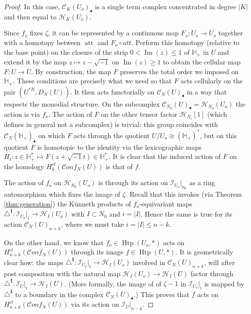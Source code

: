 \documentclass[10pt,a4paper]{amsart}
\def\Cscr{{\mathscr C}}
\def\HH{{\mathbb H}}
\def\Hcal{{\mathcal H}}
\def\Ibold{\mathbf {I}}
\def\Ical{{\mathcal I}}
\def\pt{{\scriptscriptstyle\bullet}}
\def\tri{\triangle}
\newcommand\Htp{\operatorname{Htp}}
\newcommand\att{\operatorname{att}}
\newcommand\conf{\mathscr{C}\!\mathit{onf}\!}
\newcommand\im{\operatorname{Im}}
\begin{document}
\begin{proof}
In this case, $\Cscr_K(U_o)_\pt$ is a single term complex concentrated in degree $|K|$ and then equal to $\Hcal_K(U_o)$.

Since $f_o$ fixes $\zeta$, it can be represented by a continuous map $F_o:U_o\to U_o$ together with a homotopy between $\att$ and $F_o\circ att$. 
Perform this homotopy (relative to the base point) on the closure of the strip  $0<\im(z)\le 1$ of $\HH_+$ in $U$ and extend it by the map $z\mapsto z-\sqrt{-1}$ on $\im(z)\ge 1$ to obtain the cellular map $F: U\to U$. 
By construction, the map $F$  preserves the total order we imposed on $\HH_+$. These conditions are precisely what we need so that $F$ acts cellularly on the pair  $(U^{*N}, D_N(U))$.  It then acts functorially on  $\Cscr_N(U)_\pt$ in a way that respects the monodial structure. On the subcomplex $\Cscr_{N_0}(U)_\pt=\Hcal_{N_0}(U_o)$ the action is via $f_o$. 
The action of $F$ on the other  tensor factor $\Hcal_{N_i}[1]$ (which defines   in general not a subcomplex) is trivial: this group  coincides with 
$\Cscr_N(\HH_+)_\pt$ on which $F$ acts through the quotient $U/U_o\cong (\HH_+)^*$, but on this quotient 
$F$ is homotopic to the identity via the lexicographic maps $H_t:z\in \HH_+^*\mapsto F(z+\sqrt{-1}t)\in \HH_+^*$. It is clear that the induced action of $F$ on the  homology $H^{cl}_k(\conf_N(U))$ is that of $f$. 

The  action  of $f_o$ on $\Hcal_{N_0}(U_o)$ is through its action on  $\Ical_{U_o}|_{n_0}$ as a ring automorphism which  fixes the image of $\zeta$. Recall that this invokes (via Theorem \ref{thm:generation}) the K\"unneth products of  $f_o$-equivariant maps 
$\tri^\Ibold: \Ical_{U_o}|_i\to \Hcal_I(U_o)$ with $I\subset N_0$ and $i=|I|$.  
Hence  the same is true for its action  $\Cscr_{N}(U)_{n+k}$,  where we must take   $i=|I|\le n-k$. 

On the other hand,  we know that $f_o\in \Htp(U_o,*)$ acts on $H^{cl}_{n+k}(\conf_N(U))$ through its image 
$f\in \Htp(U,*)$. It is  geometrically  clear how: the maps $\tri^\Ibold: \Ical_{U_o}|_i\to \Hcal_I(U_o)$ involved in $\Cscr_{N}(U)_{n+k}$,  will after post composition  with the natural map  $\Hcal_I(U_o)\to \Hcal_I(U)$ factor through $\tri^\Ibold: \Ical_{U}|_i\to \Hcal_I(U)$. (More formally,  the image of  
of $\zeta-1 $ in  $\Ical_{U_o}|_i$ is mapped by $\tri^\Ibold$ to a  boundary in  the complex $\Cscr_{N}(U)_\pt$.)
This proves that $f$ acts on $H^{cl}_{n+k}(\conf_N(U))$ via its action on $\Ical_{U}|_{n-k}$.
\end{proof}
\end{document}
